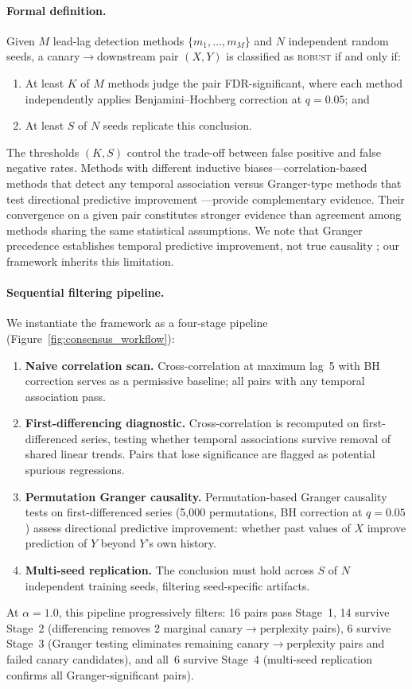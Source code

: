 \paragraph{Formal definition.}
Given $M$ lead-lag detection methods $\{m_1, \ldots, m_M\}$ and $N$ independent random seeds, a canary$\to$downstream pair $(X, Y)$ is classified as \textsc{robust} if and only if:
\begin{enumerate}
    \item At least $K$ of $M$ methods judge the pair FDR-significant, where each method independently applies Benjamini--Hochberg correction at $q{=}0.05$; and
    \item At least $S$ of $N$ seeds replicate this conclusion.
\end{enumerate}
The thresholds $(K, S)$ control the trade-off between false positive and false negative rates.
Methods with different inductive biases---correlation-based methods that detect any temporal association versus Granger-type methods that test directional predictive improvement \cite{granger1969investigating}---provide complementary evidence.
Their convergence on a given pair constitutes stronger evidence than agreement among methods sharing the same statistical assumptions.
We note that Granger precedence establishes temporal predictive improvement, not true causality \cite{shojaie2022granger}; our framework inherits this limitation.

\paragraph{Sequential filtering pipeline.}
We instantiate the framework as a four-stage pipeline (Figure~\ref{fig:consensus_workflow}):
\begin{enumerate}
    \item \textbf{Naive correlation scan.} Cross-correlation at maximum lag~5 with BH correction serves as a permissive baseline; all pairs with any temporal association pass.
    \item \textbf{First-differencing diagnostic.} Cross-correlation is recomputed on first-differenced series, testing whether temporal associations survive removal of shared linear trends. Pairs that lose significance are flagged as potential spurious regressions.
    \item \textbf{Permutation Granger causality.} Permutation-based Granger causality tests \cite{shojaie2022granger} on first-differenced series (5{,}000 permutations, BH correction at $q{=}0.05$) assess directional predictive improvement: whether past values of $X$ improve prediction of $Y$ beyond $Y$'s own history.
    \item \textbf{Multi-seed replication.} The conclusion must hold across $S$ of $N$ independent training seeds, filtering seed-specific artifacts.
\end{enumerate}
At $\alpha{=}1.0$, this pipeline progressively filters: 16 pairs pass Stage~1, 14 survive Stage~2 (differencing removes 2 marginal canary$\to$perplexity pairs), 6 survive Stage~3 (Granger testing eliminates remaining canary$\to$perplexity pairs and failed canary candidates), and all~6 survive Stage~4 (multi-seed replication confirms all Granger-significant pairs).

